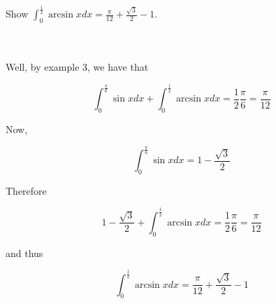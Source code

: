 Show $\int_0^{\frac12}\arcsin xdx=\frac{\pi}{12}+\frac{\sqrt{3}}{2}-1$.\\\\

\begin{solution}\renewcommand{\qedsymbol}{}\ \\
    Well, by example 3, we have that
    
    $$\int_0^{\frac{\pi}{6}}\sin xdx+\int_0^{\frac12}\arcsin xdx=\frac12\frac{\pi}{6}=\frac{\pi}{12}$$
    
    Now,
    
    $$\int_0^{\frac{\pi}{6}}\sin xdx=1-\frac{\sqrt{3}}{2}$$
    
    Therefore
    
    $$1-\frac{\sqrt{3}}{2}+\int_0^{\frac12}\arcsin xdx=\frac12\frac{\pi}{6}=\frac{\pi}{12}$$
    
    and thus
    
    $$\int_0^{\frac12}\arcsin xdx=\frac{\pi}{12}+\frac{\sqrt{3}}{2}-1$$

\end{solution}